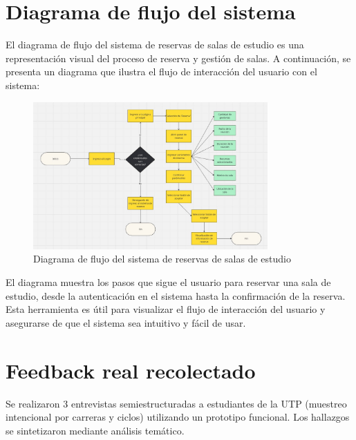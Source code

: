\documentclass{article}
\begin{document}
        \section{Diagrama de flujo del sistema}
El diagrama de flujo del sistema de reservas de salas de estudio es una representación visual del proceso de reserva y gestión de salas. A continuación, se presenta un diagrama que ilustra el flujo de interacción del usuario con el sistema:
\begin{figure}[h]
\centering
\includegraphics[width=0.8\textwidth]{assets/diagrama.jpeg}
\caption{Diagrama de flujo del sistema de reservas de salas de estudio}     
\label{fig:diagrama_flujo}
\end{figure} 

El diagrama muestra los pasos que sigue el usuario para reservar una sala de estudio, desde la autenticación en el sistema hasta la confirmación de la reserva. Esta herramienta es útil para visualizar el flujo de interacción del usuario y asegurarse de que el sistema sea intuitivo y fácil de usar.

  \section{Feedback real recolectado}

Se realizaron 3 entrevistas semiestructuradas a estudiantes de la UTP (muestreo intencional por carreras y ciclos) utilizando un prototipo funcional. Los hallazgos se sintetizaron mediante análisis temático.
\end{document}
